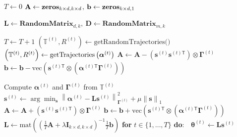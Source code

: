 \documentclass{aamas2016}
\newcommand{\transpose}{\text{$\mathsf{T}$}}
\DeclareMathOperator*{\argmin}{argmin}
\newcommand{\Task}[1]{\mathcal{Z}^{(#1)}}
\newcommand{\Mt}[1]{\phi\bigl(\mt{#1}\bigr)}
\newcommand{\mt}[1]{\bm{m}^{(#1)}}
\newcommand{\st}[1]{\bm{s}^{(#1)}}
\newcommand{\Th}[1]{\bm{\theta}^{(#1)}}
\newcommand{\At}[1]{\bm{\alpha}^{(#1)}}
\newcommand{\Tau}{|\mathbf{T}|}
\begin{document}
\begin{algorithm}[tb!]
\caption{$\mbox{PG-ELLA}\left (k,\lambda,\mu \right)$\label{alg:PGELLA}}
\label{algo:PGELLA}
\begin{algorithmic}[1]
\State $T \gets 0$
\State $\mathbf{A}\gets \mbox{\textbf{zeros}}_{k\times d,k \times d}$, \enspace $\mathbf{b} \gets \mbox{\textbf{zeros}}_{k\times d,1}$

\State $\bm{L} \gets  \bm{\text{RandomMatrix}}_{d,k}, \ \bm{D} \gets  \bm{\text{RandomMatrix}}_{m,k}$

\State $T \gets T+1$
\State $\left(\mathbb{T}^{(t)}, R^{(t)}\right) \gets \mbox{getRandomTrajectories()}$%
\Else
\State  $\Bigl(\mathbb{T}^{(t)}, R^{(t)}\Bigr) \gets \mbox{getTrajectories}\left( \bm{\alpha}^{(t)} \right)$%
\State $\mathbf{A} \gets \mathbf{A} - \left ( \boldsymbol{s}^{(t)}\boldsymbol{s}^{(t)\transpose} \right) \otimes \bm{\Gamma}^{(t)}$
\State $\mathbf{b}\gets \mathbf{b} - \mbox{vec} \left( \boldsymbol{s}^{(t)\transpose} \otimes \left( \bm{\alpha}^{(t)\transpose} \bm{\Gamma}^{(t)} \right) \right)$

\EndIf
\State Compute $\At{t}$ and $\bm{\Gamma}^{(t)}$ from $\mathbb{T}^{(t)}$
\State $\st{t}  \leftarrow  \arg\min_{\boldsymbol{s}} \left\| \boldsymbol{\alpha}^{(t)}-\boldsymbol{L} \st{t} \right\|_{\boldsymbol{\Gamma}^{(t)}}^{2} + \mu\left\|\boldsymbol{s}\right\|_{1}$
\State $\mathbf{A} \gets \mathbf{A} + \left ( \st{t} \boldsymbol{s}^{(t)\transpose} \right) \otimes \bm{\Gamma}^{(t)}$
\State $\mathbf{b}\gets \mathbf{b} + \mbox{vec} \left( \boldsymbol{s}^{(t)\transpose} \otimes \left( \bm{\alpha}^{(t)\transpose} \bm{\Gamma}^{(t)} \right) \right)$
\State $\mathbf{L} \gets \mbox{mat}\left (\left ( \frac{1}{T}\mathbf{A} + \lambda \mathbf{I}_{k\times d,k\times d}\right)^{-1} \frac{1}{T}\mathbf{b}\right)$
\State \textbf{for} $t \in \{1, \ldots, T\}$ \textbf{do}:\ \ $\Th{t} \gets \bm{L} \st{t}$ 
\EndWhile
\end{algorithmic}
\end{algorithm}
\end{document}

